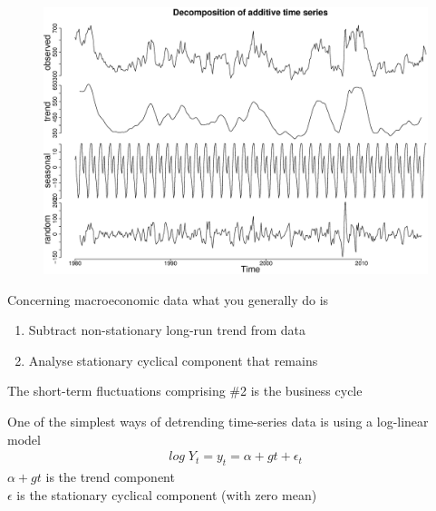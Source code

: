 \documentclass{beamer}
\begin{document}
\begin{frame}
  \begin{figure}
    \includegraphics[scale=.3]{rice3.eps}
  \end{figure}
\end{frame}

\begin{frame}
  Concerning macroeconomic data what you generally do is
  \begin{enumerate}
    \item Subtract non-stationary long-run trend from data
    \item Analyse stationary cyclical component that remains
  \end{enumerate}
  \medskip
  The short-term fluctuations comprising \#2 is the business cycle
\end{frame}


\begin{frame}
  One of the simplest ways of detrending time-series data is using a log-linear model
  \begin{align}
    log\; Y_t = y_t = \alpha +gt + \epsilon_t
  \end{align}
  \medskip
  $\alpha+gt$ is the trend component\\
  $\epsilon$ is the stationary cyclical component (with zero mean)
\end{frame}
\end{document}
